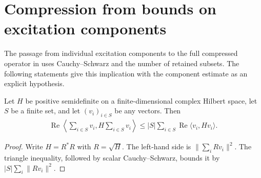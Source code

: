 \section{Compression from bounds on excitation components}
\label{sec:replica_excitation_compression}

The passage from individual excitation components to the full compressed
operator in \cite[Section~8, lines~577--590]{OpenAI2026AreaLaw} uses
Cauchy--Schwarz and the number of retained subsets. The following statements
give this implication with the component estimate as an explicit hypothesis.

\begin{theorem}
  \label{thm:positive_form_finite_sum}
  \leanok
  Let $H$ be positive semidefinite on a finite-dimensional complex Hilbert
  space, let $S$ be a finite set, and let $(v_i)_{i\in S}$ be any vectors.
  Then
  \begin{align}
    \operatorname{Re}\left\langle\sum_{i\in S}v_i,
      H\sum_{i\in S}v_i\right\rangle
    \le |S|\sum_{i\in S}\operatorname{Re}\langle v_i,Hv_i\rangle.
  \end{align}
\end{theorem}
\begin{proof}
  \leanok
  Write $H=R^*R$ with $R=\sqrt H$. The left-hand side is
  $\|\sum_i Rv_i\|^2$. The triangle inequality, followed by scalar
  Cauchy--Schwarz, bounds it by $|S|\sum_i\|Rv_i\|^2$.
\end{proof}

